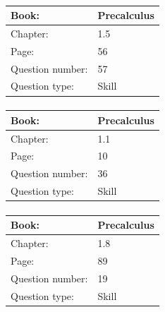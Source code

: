 \documentclass{article}
\begin{document}
            \paragraph{}
            \begin{tabularx}{1\textwidth}{
                    p{}
                    p{}
                }
                \toprule
                Book: & Precalculus
                \\
                \midrule
                Chapter: & 1.5
                \\
                \midrule
                Page: & 56
                \\
                \midrule
                Question number: & 57
                \\
                \midrule
                Question type: & Skill
                \\
                \bottomrule
            \end{tabularx}
            
            \paragraph{}
            \begin{tabularx}{1\textwidth}{
                    p{}
                    p{}
                }
                \toprule
                Book: & Precalculus
                \\
                \midrule
                Chapter: & 1.1
                \\
                \midrule
                Page: & 10
                \\
                \midrule
                Question number: & 36
                \\
                \midrule
                Question type: & Skill
                \\
                \bottomrule
            \end{tabularx}
            
            \paragraph{}
            \begin{tabularx}{1\textwidth}{
                    p{}
                    p{}
                }
                \toprule
                Book: & Precalculus
                \\
                \midrule
                Chapter: & 1.8
                \\
                \midrule
                Page: & 89
                \\
                \midrule
                Question number: & 19
                \\
                \midrule
                Question type: & Skill
                \\
                \bottomrule
            \end{tabularx}
            
\end{document}
